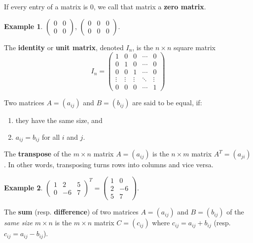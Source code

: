 \documentclass[
  12pt,
  oneside]{book}
\providecommand{\tightlist}{%
  \setlength{\itemsep}{0pt}\setlength{\parskip}{0pt}}
\theoremstyle{definition}
\theoremstyle{definition}
\newtheorem{example}{Example}[chapter]
\theoremstyle{definition}
\theoremstyle{definition}
\theoremstyle{remark}
\begin{document}
If every entry of a matrix is \(0\), we call that matrix a \textbf{zero matrix}.

\begin{example}
\protect\hypertarget{exm:unnamed-chunk-37}{}{\label{exm:unnamed-chunk-37} }\(\begin{pmatrix} 0 & 0\\ 0 & 0\end{pmatrix}\), \(\begin{pmatrix} 0 & 0 & 0\\ 0 & 0 & 0\end{pmatrix}\).
\end{example}

The \textbf{identity} or \textbf{unit matrix}, denoted \(I_n\), is the \(n\times n\) square matrix
\[
I_n = \begin{pmatrix} 1 & 0 & 0 & \cdots & 0\\
    0 & 1 & 0 & \cdots & 0\\
    0 & 0 & 1 & \cdots & 0\\
    \vdots & \vdots & \vdots & \ddots & \vdots \\
    0 & 0 & 0 & \cdots & 1
\end{pmatrix}
\]

Two matrices \(A=(a_{ij})\) and \(B=(b_{ij})\) are said to be equal, if:

\begin{enumerate}
\def\labelenumi{(\alph{enumi})}
\tightlist
\item
  they have the same size, and
\item
  \(a_{ij}=b_{ij}\) for all \(i\) and \(j\).
\end{enumerate}

The \textbf{transpose} of the \(m\times n\) matrix \(A=(a_{ij})\) is the \(n\times m\) matrix \(A^{T} = (a_{ji})\).
In other words, transposing turns rows into columns and vice versa.

\begin{example}
\protect\hypertarget{exm:unnamed-chunk-38}{}{\label{exm:unnamed-chunk-38} }\(\begin{pmatrix}1 & 2 & 5 \\ 0 & -6 & 7\end{pmatrix}^T = \begin{pmatrix}1&0\\2&-6\\5&7\end{pmatrix}\).
\end{example}

The \textbf{sum} (resp. \textbf{difference}) of two matrices \(A=(a_{ij})\) and \(B=(b_{ij})\) of the \emph{same size} \(m\times n\) is the \(m\times n\) matrix \(C=(c_{ij})\) where \(c_{ij}=a_{ij} + b_{ij}\) (resp. \(c_{ij}=a_{ij}-b_{ij}\)).
\end{document}
